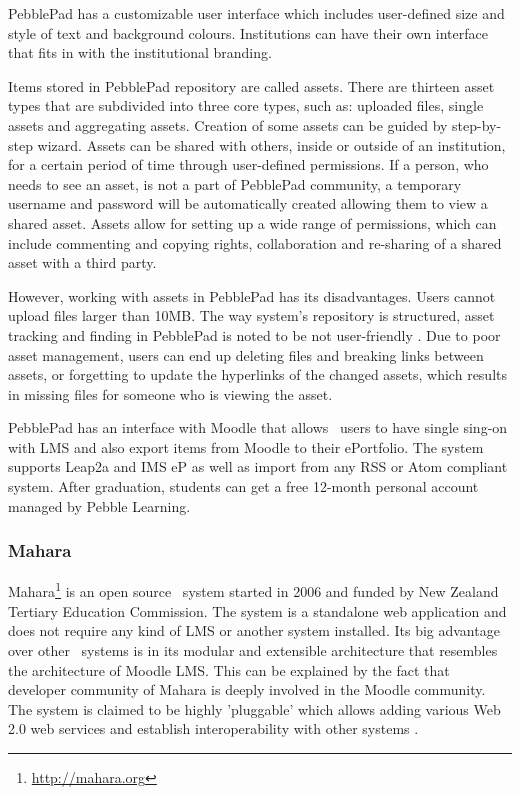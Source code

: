 PebblePad has a customizable user interface which includes user-defined size and
style of text and background colours. Institutions can have their own interface
that fits in with the institutional branding.

Items stored in PebblePad repository are called assets. There are thirteen asset
types that are subdivided into three core types, such as: uploaded files, single
assets and aggregating assets. Creation of some assets can be guided by
step-by-step wizard. Assets can be shared with others, inside or outside of an
institution, for a certain period of time through user-defined permissions. If a
person, who needs to see an asset, is not a part of PebblePad community, a
temporary username and password will be automatically created allowing them to
view a shared asset. Assets allow for setting up a wide range of permissions,
which can include commenting and copying rights, collaboration and re-sharing
of a shared asset with a third party.

However, working with assets in PebblePad has its disadvantages. Users cannot
upload files larger than 10MB. The way system's repository is structured, asset
tracking and finding in PebblePad is noted to be not user-friendly
\citep{Overton2009}. Due to poor asset management, users can end up deleting
files and breaking links between assets, or forgetting to update the hyperlinks
of the changed assets, which results in missing files for someone who is viewing
the asset.

PebblePad has an interface with Moodle that allows \ep~users to have
single sing-on with LMS and also export items from Moodle to their ePortfolio.
The system supports Leap2a and IMS eP as well as import from any RSS or Atom
compliant system. After graduation, students can get a free 12-month personal
account managed by Pebble Learning.
 
\subsubsection{Mahara}
Mahara\footnote{\url{http://mahara.org}} is an open source \ep~system started in
2006 and funded by New Zealand Tertiary Education Commission. The system is a
standalone web application and does not require any kind of LMS or another
system installed. Its big advantage over other \ep~systems is in its modular and
extensible architecture that resembles the architecture of Moodle LMS. This can
be explained by the fact that developer community of Mahara is deeply involved
in the Moodle community. The system is claimed to be highly 'pluggable' which
allows adding various Web 2.0 web services and establish interoperability with
other systems \citep{MaharaGovernanceGroup2011}.

